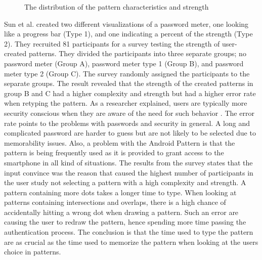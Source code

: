 \begin{figure}[H]
{        \label{fig:patterngraph3}
      }
      \caption{The distribution of the pattern characteristics and strength \cite{Sun}}
      \label{fig:patterngraph}
    \end{figure}

  Sun et al. \cite{Sun} created two different visualizations of a password meter, one looking like a progress bar (Type 1), and one indicating a percent of the strength (Type 2). They recruited 81 participants for a survey testing the strength of user-created patterns. They divided the participants into three separate groups; no password meter (Group A),  password meter type 1 (Group B), and password meter type 2 (Group C). The survey randomly assigned the participants to the separate groups. The result revealed that the strength of the created patterns in group B and C had a higher complexity and strength but had a higher error rate when retyping the pattern. As a researcher explained, users are typically more security conscious when they are aware of the need for such behavior \cite{Sasse}. The error rate points to the problems with passwords and security in general. A long and complicated password are harder to guess but are not likely to be selected due to memorability issues. Also, a problem with the Android Pattern is that the pattern is being frequently used as it is provided to grant access to the smartphone in all kind of situations. The results from the survey states that the input convince was the reason that caused the highest number of participants in the user study not selecting a pattern with a high complexity and strength. A pattern containing more dots takes a longer time to type. When looking at patterns containing intersections and overlaps, there is a high chance of accidentally hitting a wrong dot when drawing a pattern. Such an error are causing the user to redraw the pattern, hence spending more time passing the authentication process. The conclusion is that the time used to type the pattern are as crucial as the time used to memorize the pattern when looking at the users choice in patterns.

